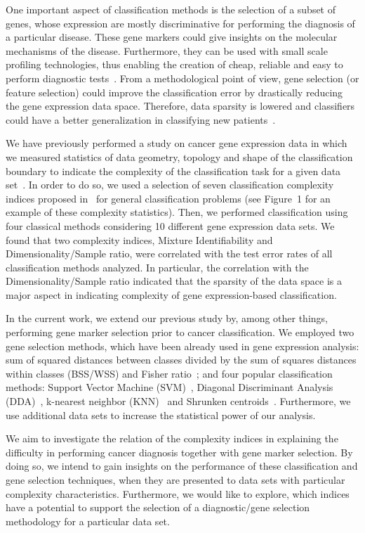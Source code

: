 \documentclass[10pt]{bmc_article}
\newenvironment{bmcformat}{\begin{raggedright}\baselineskip20pt\sloppy\setboolean{publ}{false}}{\end{raggedright}\baselineskip20pt\sloppy}
\begin{document}
\begin{bmcformat}
One important aspect of classification methods is the selection of a
subset of genes, whose expression are mostly discriminative for
performing the diagnosis of a particular disease. These gene markers
could give insights on the molecular mechanisms of the
disease. Furthermore, they can be used with small scale profiling
technologies, thus enabling the creation of cheap, reliable and easy
to perform diagnostic tests~\cite{Veer2008}. From a methodological
point of view, gene selection (or feature selection) could improve the
classification error by drastically reducing the gene expression
data space. Therefore, data sparsity is lowered and classifiers could
have a better generalization in classifying new
patients~\cite{Song2007}.

We have previously performed a study on cancer gene expression data in
which we measured statistics of data geometry, topology and shape of
the classification boundary to indicate the complexity of the
classification task for a given data set~\cite{Costa2009b}.  In order
to do so, we used a selection of seven classification complexity
indices proposed in~\cite{Ho2002} for general classification problems
(see Figure~1 for an example of these complexity statistics). Then, we
performed classification using four classical methods considering 10
different gene expression data sets. We found that two complexity
indices, Mixture Identifiability and Dimensionality/Sample ratio, were
correlated with the test error rates of all classification methods
analyzed. In particular, the correlation with the
Dimensionality/Sample ratio indicated that the sparsity of the data
space is a major aspect in indicating complexity of gene
expression-based classification.

In the current work, we extend our previous study by, among other
things, performing gene marker selection prior to cancer
classification. We employed two gene selection methods, which have been
already used in gene expression analysis: sum of squared distances
between classes divided by the sum of squares distances within classes
(BSS/WSS) and Fisher ratio~\cite{Dudoit2002}; and four popular
classification methods: Support Vector Machine
(SVM)~\cite{Vapnik1995}, Diagonal Discriminant Analysis
(DDA)~\cite{Hastie2001}, k-nearest neighbor (KNN)~\cite{Ripley1996}
and Shrunken centroids~\cite{Tibshirani2002}. Furthermore, we use
additional data sets to increase the statistical power of our
analysis. 

We aim to investigate the relation of the complexity indices in
explaining the difficulty in performing cancer diagnosis together with
gene marker selection. By doing so, we intend to gain insights on the
performance of these classification and gene selection techniques,
when they are presented to data sets with particular complexity
characteristics.  Furthermore, we would like to explore, which indices
have a potential to support the selection of a diagnostic/gene
selection methodology for a particular data set.



\end{bmcformat}
\end{document}
